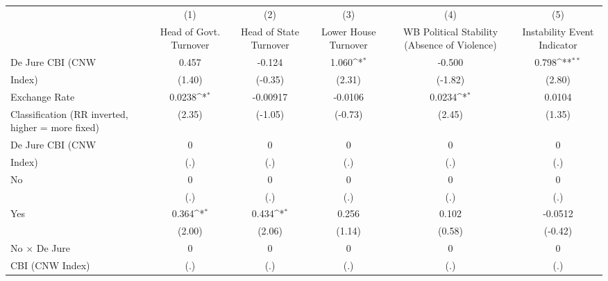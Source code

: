 {
\def\sym#1{\ifmmode^{#1}\else\(^{#1}\)\fi}
\begin{tabular}{l*{5}{c}}
\hline\hline
                    &\multicolumn{1}{c}{(1)}&\multicolumn{1}{c}{(2)}&\multicolumn{1}{c}{(3)}&\multicolumn{1}{c}{(4)}&\multicolumn{1}{c}{(5)}\\
                    &\multicolumn{1}{c}{Head of Govt. Turnover}&\multicolumn{1}{c}{Head of State Turnover}&\multicolumn{1}{c}{Lower House Turnover}&\multicolumn{1}{c}{WB Political Stability (Absence of Violence)}&\multicolumn{1}{c}{Instability Event Indicator}\\
\hline
De Jure CBI (CNW    &       0.457         &      -0.124         &       1.060\sym{*}  &      -0.500         &       0.798\sym{**} \\
Index)              &      (1.40)         &     (-0.35)         &      (2.31)         &     (-1.82)         &      (2.80)         \\
[1em]
Exchange Rate       &      0.0238\sym{*}  &    -0.00917         &     -0.0106         &      0.0234\sym{*}  &      0.0104         \\
Classification (RR inverted, higher = more fixed)&      (2.35)         &     (-1.05)         &     (-0.73)         &      (2.45)         &      (1.35)         \\
[1em]
De Jure CBI (CNW    &           0         &           0         &           0         &           0         &           0         \\
Index)              &         (.)         &         (.)         &         (.)         &         (.)         &         (.)         \\
[1em]
No                  &           0         &           0         &           0         &           0         &           0         \\
                    &         (.)         &         (.)         &         (.)         &         (.)         &         (.)         \\
[1em]
Yes                 &       0.364\sym{*}  &       0.434\sym{*}  &       0.256         &       0.102         &     -0.0512         \\
                    &      (2.00)         &      (2.06)         &      (1.14)         &      (0.58)         &     (-0.42)         \\
[1em]
No $\times$ De Jure &           0         &           0         &           0         &           0         &           0         \\
CBI (CNW Index)     &         (.)         &         (.)         &         (.)         &         (.)         &         (.)         \\

\end{tabular}}
